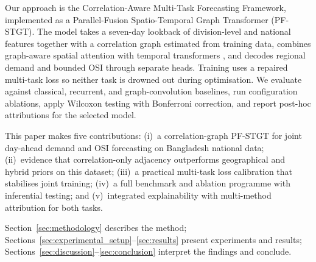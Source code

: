 Our approach is the Correlation-Aware Multi-Task Forecasting Framework, implemented as a Parallel-Fusion Spatio-Temporal Graph Transformer (PF-STGT). The model takes a seven-day lookback of division-level and national features together with a correlation graph estimated from training data, combines graph-aware spatial attention with temporal transformers \cite{Vaswani2017Attention}, and decodes regional demand and bounded OSI through separate heads. Training uses a repaired multi-task loss so neither task is drowned out during optimisation. We evaluate against classical, recurrent, and graph-convolution baselines, run configuration ablations, apply Wilcoxon testing with Bonferroni correction, and report post-hoc attributions for the selected model.

This paper makes five contributions: (i)~a correlation-graph PF-STGT for joint day-ahead demand and OSI forecasting on Bangladesh national data; (ii)~evidence that correlation-only adjacency outperforms geographical and hybrid priors on this dataset; (iii)~a practical multi-task loss calibration that stabilises joint training; (iv)~a full benchmark and ablation programme with inferential testing; and (v)~integrated explainability with multi-method attribution for both tasks.

Section~\ref{sec:methodology} describes the method; Sections~\ref{sec:experimental_setup}--\ref{sec:results} present experiments and results; Sections~\ref{sec:discussion}--\ref{sec:conclusion} interpret the findings and conclude.
